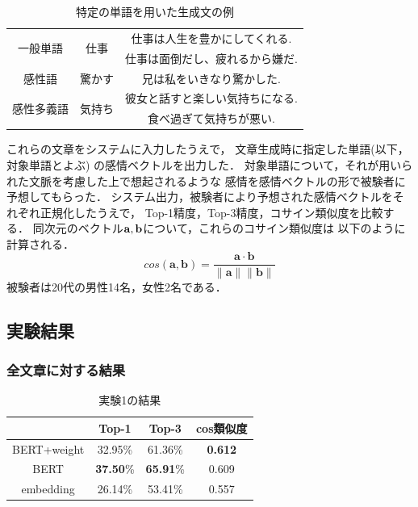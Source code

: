 		\begin{table}[H]
			\centering
			\caption{特定の単語を用いた生成文の例}
			\label{table:generated_sentences_sample}
			\begin{tabular}{|c|c|c|}
				\hline
				\multirow{2}{*}{一般単語} & \multirow{2}{*}{仕事} & 仕事は人生を豊かにしてくれる. \\
				\cline{3-3}
				& & 仕事は面倒だし、疲れるから嫌だ. \\
				\hline
				感性語 & 驚かす & 兄は私をいきなり驚かした. \\
				\hline
				\multirow{2}{*}{感性多義語} & \multirow{2}{*}{気持ち} & 彼女と話すと楽しい気持ちになる. \\
				\cline{3-3}
				& & 食べ過ぎて気持ちが悪い. \\
				\hline
			\end{tabular}
		\end{table}

		これらの文章をシステムに入力したうえで，
		文章生成時に指定した単語(以下，対象単語とよぶ)
		の感情ベクトルを出力した．
		対象単語について，それが用いられた文脈を考慮した上で想起されるような
		感情を感情ベクトルの形で被験者に予想してもらった．
		システム出力，被験者により予想された感情ベクトルをそれぞれ正規化したうえで，
		Top-1精度，Top-3精度，コサイン類似度を比較する．
		同次元のベクトル$\bold{a},\bold{b}$について，これらのコサイン類似度は
		以下のように計算される．
		\begin{equation}
			cos(\boldsymbol{a},\boldsymbol{b})=\frac{\boldsymbol{a}\cdot\boldsymbol{b}}{\|\boldsymbol{a}\|\|\boldsymbol{b}\|}
		\end{equation}
		被験者は20代の男性14名，女性2名である．

	\subsection{実験結果}
		\subsubsection{全文章に対する結果}
			\begin{table}[H]
				\centering
				\caption{実験1の結果}
				\label{table:top-k_cos-sim_all}
					\begin{tabular}{cccc}
						\hline
						& Top-1 & Top-3 & cos類似度 \\
						\hline \hline
						BERT+weight & 32.95\% & 61.36\% & \textbf{0.612} \\
						BERT & \textbf{37.50}\% & \textbf{65.91}\% & 0.609 \\
						embedding & 26.14\% & 53.41\% & 0.557\\
						\hline
					\end{tabular}
			\end{table}

